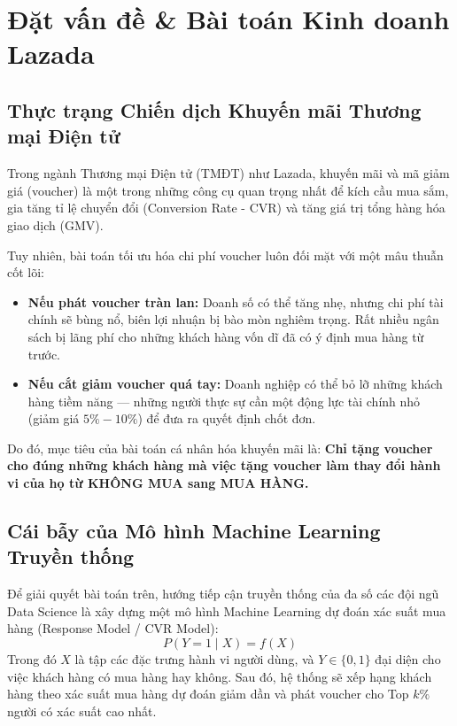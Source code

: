 
\chapter{Đặt vấn đề \& Bài toán Kinh doanh Lazada}

\section{Thực trạng Chiến dịch Khuyến mãi Thương mại Điện tử}

Trong ngành Thương mại Điện tử (TMĐT) như Lazada, khuyến mãi và mã giảm giá (voucher) là một trong những công cụ quan trọng nhất để kích cầu mua sắm, gia tăng tỉ lệ chuyển đổi (Conversion Rate - CVR) và tăng giá trị tổng hàng hóa giao dịch (GMV). 

Tuy nhiên, bài toán tối ưu hóa chi phí voucher luôn đối mặt với một mâu thuẫn cốt lõi:
\begin{itemize}[leftmargin=*]
    \item \textbf{Nếu phát voucher tràn lan:} Doanh số có thể tăng nhẹ, nhưng chi phí tài chính sẽ bùng nổ, biên lợi nhuận bị bào mòn nghiêm trọng. Rất nhiều ngân sách bị lãng phí cho những khách hàng vốn dĩ đã có ý định mua hàng từ trước.
    \item \textbf{Nếu cắt giảm voucher quá tay:} Doanh nghiệp có thể bỏ lỡ những khách hàng tiềm năng — những người thực sự cần một động lực tài chính nhỏ (giảm giá $5\% - 10\%$) để đưa ra quyết định chốt đơn.
\end{itemize}

Do đó, mục tiêu của bài toán cá nhân hóa khuyến mãi là: \textbf{Chỉ tặng voucher cho đúng những khách hàng mà việc tặng voucher làm thay đổi hành vi của họ từ KHÔNG MUA sang MUA HÀNG.}

\section{Cái bẫy của Mô hình Machine Learning Truyền thống}

Để giải quyết bài toán trên, hướng tiếp cận truyền thống của đa số các đội ngũ Data Science là xây dựng một mô hình Machine Learning dự đoán xác suất mua hàng (Response Model / CVR Model):
\begin{equation}
    P(Y = 1 \mid X) = f(X)
\end{equation}
Trong đó $X$ là tập các đặc trưng hành vi người dùng, và $Y \in \{0, 1\}$ đại diện cho việc khách hàng có mua hàng hay không. Sau đó, hệ thống sẽ xếp hạng khách hàng theo xác suất mua hàng dự đoán giảm dần và phát voucher cho Top $k\%$ người có xác suất cao nhất.

